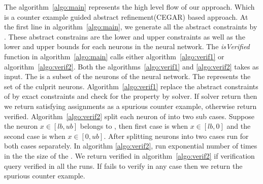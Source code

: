 








The algorithm~\ref{algo:main} represents the high level flow of our approach. Which is a counter example guided abstract refinement(CEGAR) based approach. 
At the first line in algorithm~\ref{algo:main}, we generate all the abstract constraints by \deeppoly{}. These abstract constrains
are the lower and upper constraints as well as the lower and upper bounds for each neurons in the neural network.
The \emph{isVerified} function in algorithm~\ref{algo:main} calls either algorithm~\ref{algo:verif1} or algorithm~\ref{algo:verif2}. 
Both the algorithms~\ref{algo:verif1} and \ref{algo:verif2} takes \markednewrons{} as input. The \markednewrons{} 
is a subset of the neurons of the neural network. The \markednewrons{} represents the set of the culprit neurons. 
Algorithm~\ref{algo:verif1} replace the abstract constraints of \markednewrons{} by exact constraints and check for the 
property by \milp{} solver. If \milp{} solver return \sat{} then we return satisfying assignments as a spurious counter example, 
otherwise return verified. Algorithm~\ref{algo:verif2} split each neuron of \markednewrons{} into two sub cases. Suppose the 
neuron $x\in [lb,ub]$ belongs to \markednewrons{}, then first case is when $x \in [lb,0]$ and the second case is when $x \in [0,ub]$.   
After splitting neurons into two cases \deeppoly{} run for both cases separately. In algorithm \ref{algo:verif2}, \deeppoly{}
run exponential number of times in the the size of the \markednewrons{}. We return verified in algorithm~\ref{algo:verif2} if 
verification query verified in all the \deeppoly{} runs. If \deeppoly{} fails to verify in any case then we return the spurious counter example. 


